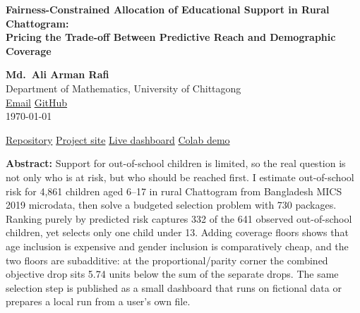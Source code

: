 \documentclass[12.1pt,a4paper]{article}
\begin{document}
\begin{center}
\vspace*{2pt}

{\LARGE\bfseries{}
Fairness-Constrained Allocation of Educational Support in Rural Chattogram:\\[4pt]
Pricing the Trade-off Between Predictive Reach and Demographic Coverage}

\vspace{12pt}

{\large\bfseries Md.\ Ali Arman Rafi}\\[4pt]

{\normalsize
Department of Mathematics, University of Chittagong\\[3pt]
\href{mailto:sbrafi10@gmail.com}{Email}
\enspace\textbullet\enspace
\href{https://github.com/rafi-math}{GitHub}\\[5pt]
{\small\today}}
\end{center}

\vspace{6pt}

\begin{center}
\small
\href{https://github.com/rafi-math/edu-support-optimization-bd}{Repository}
\enspace\textbullet\enspace
\href{https://rafi-math.github.io/edu-support-optimization-bd/}{Project site}
\enspace\textbullet\enspace
\href{https://rafi-math.github.io/edu-support-optimization-bd/equireach.html}{Live dashboard}
\enspace\textbullet\enspace
\href{https://colab.research.google.com/github/rafi-math/edu-support-optimization-bd/blob/main/docs/phase3_reproduce_demo.ipynb}{Colab demo}
\end{center}

\vspace{4pt}

\noindent
\begin{minipage}{\textwidth}
\small{}
\textbf{Abstract: }\enspace
Support for out-of-school children is limited, so the real question is not only who is at risk, but who should be reached first. I estimate out-of-school risk for 4,861 children aged 6--17 in rural Chattogram from Bangladesh MICS 2019 microdata, then solve a budgeted selection problem with 730 packages. Ranking purely by predicted risk captures 332 of the 641 observed out-of-school children, yet selects only one child under 13. Adding coverage floors shows that age inclusion is expensive and gender inclusion is comparatively cheap, and the two floors are subadditive: at the proportional/parity corner the combined objective drop sits 5.74 units below the sum of the separate drops. The same selection step is published as a small dashboard that runs on fictional data or prepares a local run from a user's own file.
\end{minipage}
\end{document}
